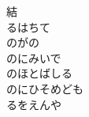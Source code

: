 \documentclass[10pt,b5j]{tarticle} %
\begin{document}
\begin{enumerate}
\begin{minipage}[c]{\blocksize}
        \vspace{\linespace}
        \item[結]~\\
        るはちて\\
        のがの\\
        のにみいで\\
        のほとばしる\\
        のにひそめども\\
        るをえんや
    
    \end{minipage}
\end{enumerate} %
\end{document}
